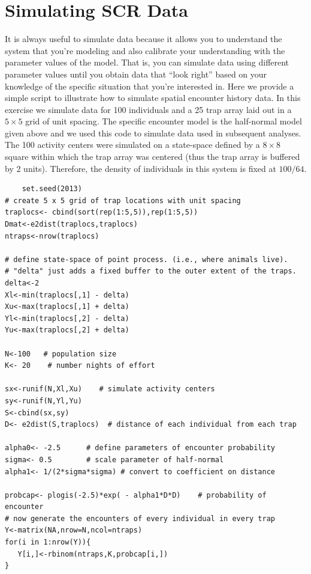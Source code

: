 \section{Simulating SCR Data}

It is always useful to simulate data because it allows you to
understand the system that you're modeling and also calibrate your
understanding with the parameter values of the model. That is, you can
simulate data using different parameter values until you obtain data
that ``look right'' based on your knowledge of the specific situation
that you're interested in. Here we provide a simple script to
illustrate how to simulate spatial encounter history data. In this
exercise we simulate data for 100 individuals and a 25 trap array laid
out in a $5 \times 5$ grid of unit spacing.  The specific encounter model is
the half-normal model given above and we used this code to simulate
data used in subsequent analyses.  The 100 activity centers were
simulated on a state-space defined by a $8 \times 8$ square within which the
trap array was centered (thus the trap array is buffered by 2
units). Therefore, the density of individuals in this system is fixed
at $100/64$.

{\small
\begin{verbatim}
	set.seed(2013)
# create 5 x 5 grid of trap locations with unit spacing
traplocs<- cbind(sort(rep(1:5,5)),rep(1:5,5))
Dmat<-e2dist(traplocs,traplocs) 
ntraps<-nrow(traplocs)

# define state-space of point process. (i.e., where animals live).
# "delta" just adds a fixed buffer to the outer extent of the traps.
delta<-2
Xl<-min(traplocs[,1] - delta)
Xu<-max(traplocs[,1] + delta)
Yl<-min(traplocs[,2] - delta)
Yu<-max(traplocs[,2] + delta)

N<-100   # population size
K<- 20    # number nights of effort

sx<-runif(N,Xl,Xu)    # simulate activity centers
sy<-runif(N,Yl,Yu)
S<-cbind(sx,sy)
D<- e2dist(S,traplocs)  # distance of each individual from each trap

alpha0<- -2.5      # define parameters of encounter probability
sigma<- 0.5        # scale parameter of half-normal
alpha1<- 1/(2*sigma*sigma) # convert to coefficient on distance

probcap<- plogis(-2.5)*exp( - alpha1*D*D)    # probability of encounter 
# now generate the encounters of every individual in every trap
Y<-matrix(NA,nrow=N,ncol=ntraps)
for(i in 1:nrow(Y)){
   Y[i,]<-rbinom(ntraps,K,probcap[i,])
}
\end{verbatim}
}

